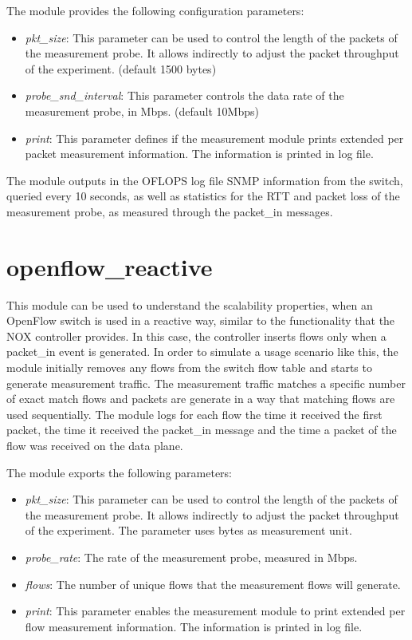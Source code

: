 \documentclass{book}
\begin{document}
The module provides the following configuration parameters:
\begin{itemize}
    \item \emph{pkt\_size}:  This parameter can be used to control the length of the
        packets of the measurement probe. It allows indirectly to adjust the packet
        throughput of the experiment. (default 1500 bytes)
    \item \emph{probe\_snd\_interval}: This parameter controls the data rate of the
        measurement probe, in Mbps. (default 10Mbps)
    \item \emph{print}: This parameter defines if the measurement module prints
        extended per packet measurement information. The information is printed in log
        file. 
\end{itemize}

The module outputs in the OFLOPS log file SNMP information from the 
switch, queried every 10 seconds, as well as statistics for the RTT and packet 
loss of the measurement probe, as measured through the packet\_in messages.

\section{openflow\_reactive}

This module can be used to understand the scalability properties, when an
OpenFlow switch is used in a reactive way, similar to the functionality that the NOX
controller provides. In this case, the controller inserts flows only when a
packet\_in event is generated. In order to simulate a usage scenario like 
this, the module initially removes any flows from the switch flow table and starts to generate
measurement traffic. The measurement traffic matches a specific number of
exact match flows and packets are generate in a way that matching flows are
used sequentially. The module logs for each flow the time it received the first
packet, the time it received the packet\_in message and the time a packet of the
flow was received on the data plane. 

The module exports the following parameters:
\begin{itemize}
    \item \emph{pkt\_size}: This parameter can be used to control the length of the
        packets of the measurement probe. It allows indirectly to adjust the packet
        throughput of the experiment. The parameter uses bytes as measurement unit.
    \item \emph{probe\_rate}: The rate of the measurement probe, measured in Mbps. 
    \item \emph{flows}: The number of unique flows that the measurement flows will
        generate.
    \item \emph{print}:  This parameter enables the measurement module to print
        extended per flow measurement information. The information is printed in log
        file.
\end{itemize}
\end{document}
